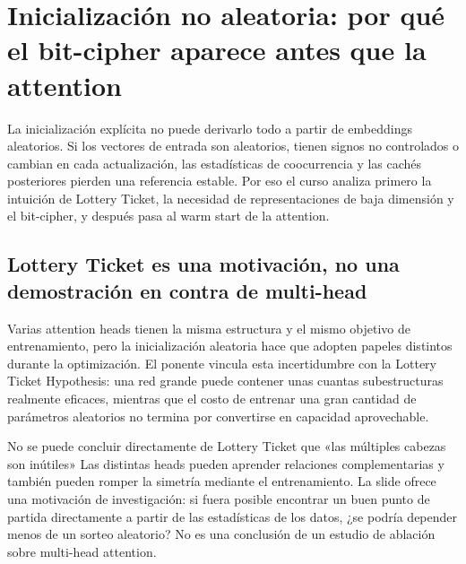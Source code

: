 \section{Inicialización no aleatoria: por qué el bit-cipher aparece antes que la attention}

La inicialización explícita no puede derivarlo todo a partir de embeddings aleatorios. Si los vectores de entrada son aleatorios, tienen signos no controlados o cambian en cada actualización, las estadísticas de coocurrencia y las cachés posteriores pierden una referencia estable. Por eso el curso analiza primero la intuición de Lottery Ticket, la necesidad de representaciones de baja dimensión y el bit-cipher, y después pasa al warm start de la attention.

\subsection{Lottery Ticket es una motivación, no una demostración en contra de multi-head}

Varias attention heads tienen la misma estructura y el mismo objetivo de entrenamiento, pero la inicialización aleatoria hace que adopten papeles distintos durante la optimización. El ponente vincula esta incertidumbre con la Lottery Ticket Hypothesis: una red grande puede contener unas cuantas subestructuras realmente eficaces, mientras que el costo de entrenar una gran cantidad de parámetros aleatorios no termina por convertirse en capacidad aprovechable.


\begin{warningbox}{No se puede concluir directamente de Lottery Ticket que «las múltiples cabezas son inútiles»}
Las distintas heads pueden aprender relaciones complementarias y también pueden romper la simetría mediante el entrenamiento. La slide ofrece una motivación de investigación: si fuera posible encontrar un buen punto de partida directamente a partir de las estadísticas de los datos, ¿se podría depender menos de un sorteo aleatorio? No es una conclusión de un estudio de ablación sobre multi-head attention.
\end{warningbox}


